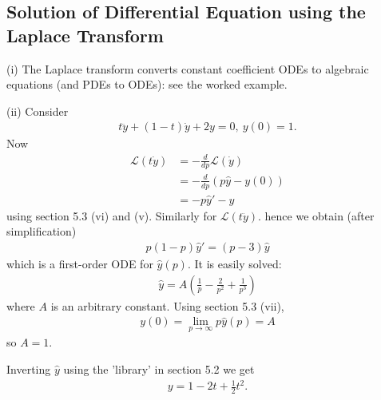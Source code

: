 \documentclass[a4paper]{article}
\begin{document}
\subsection{Solution of Differential Equation using the Laplace Transform}
\begin{eg}
(i) The Laplace transform converts constant coefficient ODEs to algebraic equations (and PDEs to ODEs): see the worked example.

(ii) Consider
\begin{equation*}
\begin{aligned}
t\ddot{y} + (1-t)\dot{y} + 2y = 0, \ y(0) = 1.
\end{aligned}
\end{equation*}
Now
\begin{equation*}
\begin{aligned}
\mathcal{L}(t\dot{y}) &= -\frac{d}{dp}\mathcal{L}(\dot{y})\\
&= -\frac{d}{dp}(p\hat{y}-y(0))\\
&= -p\hat{y}'-y
\end{aligned}
\end{equation*}
using section 5.3 (vi) and (v). Similarly for $\mathcal{L}(t\ddot{y})$. hence we obtain (after simplification)
\begin{equation*}
\begin{aligned}
p(1-p)\hat{y}' = (p-3)\hat{y}
\end{aligned}
\end{equation*}
which is a first-order ODE for $\hat{y}(p)$. It is easily solved:
\begin{equation*}
\begin{aligned}
\hat{y} = A \left(\frac{1}{p} - \frac{2}{p^2} + \frac{1}{p^3}\right)
\end{aligned}
\end{equation*}
where $A$ is an arbitrary constant. Using section 5.3 (vii),
\begin{equation*}
\begin{aligned}
y(0) = \lim_{p \to \infty} p\hat{y}(p) = A
\end{aligned}
\end{equation*}
so $A=1$.

Inverting $\hat{y}$ using the 'library' in section 5.2 we get
\begin{equation*}
\begin{aligned}
y = 1 -2t + \frac{1}{2}t^2.
\end{aligned}
\end{equation*}
\end{eg}
\end{document}

